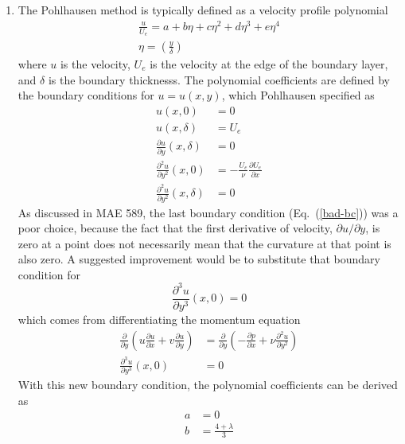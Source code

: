 \documentclass[a4paper]{article}
\newcommand{\eref}[1]{Eq.~(\ref{#1})}
\newcommand{\pd}[2]{\frac{\partial #1}{\partial #2}}
\newcommand{\pnd}[3]{\frac{\partial^{#3} #1}{\partial #2^{#3}}}
\begin{document}
\begin{enumerate}
  \item The Pohlhausen method is typically defined as a velocity profile polynomial
    \begin{equation}
      \begin{gathered}
        \frac{u}{U_e} = a + b\eta + c\eta^2 + d\eta^3 + e\eta^4 \\
        \eta = \left( \frac{y}{\delta} \right)
      \end{gathered}
      \label{u-polynomial}
    \end{equation}
    where $u$ is the velocity, $U_e$ is the velocity at the edge of the
    boundary layer, and $\delta$ is the boundary thicknesss.  The polynomial
    coefficients are defined by the boundary conditions for $u = u(x,y)$, which
    Pohlhausen specified as
    \begin{align}
      u(x,0) &= 0 \\
      u(x,\delta) &= U_e \\
      \pd{u}{y}(x,\delta) &= 0 \\
      \pnd{u}{y}{2}(x,0) &=
      -\frac{U_e}{\nu}\pd{U_e}{x} \\
      \pnd{u}{y}{2}(x,\delta) &= 0 \label{bad-bc}
    \end{align}
    As discussed in MAE 589, the last boundary condition (\eref{bad-bc}) was a
    poor choice, because the fact that the first derivative of velocity, $\partial
    u/\partial y$, is zero at a point does not necessarily mean that the
    curvature at that point is also zero.  A suggested improvement would be to
    substitute that boundary condition for
    \begin{equation}
      \pnd{u}{y}{3}(x,0) = 0
      \label{improved-bc}
    \end{equation}
    which comes from differentiating the momentum equation
    \begin{equation}
      \begin{aligned}
        \pd{}{y}\left( u \pd{u}{x} + v\pd{u}{y}\right) &= \pd{}{y}\left(
        -\pd{p}{x} + \nu \pnd{u}{y}{2} \right) \\
        \pnd{u}{y}{3}(x,0) &= 0
      \end{aligned}
      \label{bc-deriv}
    \end{equation}
    With this new boundary condition, the polynomial coefficients can be derived
    as
    \begin{align}
      a &= 0 \\
      b &= \frac{4 + \lambda}{3} \\

\end{align}
\end{enumerate}
\end{document}
